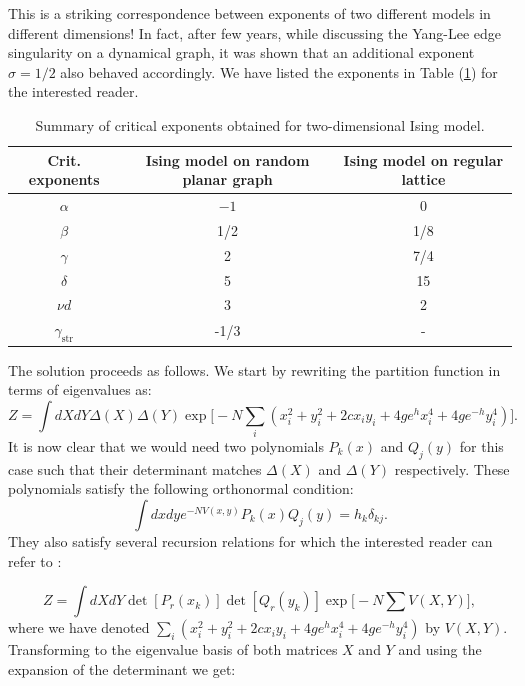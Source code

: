 \documentclass[letter,11pt]{article}
\begin{document}
This is a striking correspondence between exponents of two different models in different dimensions! In fact, 
after few years, while discussing the Yang-Lee edge singularity on a dynamical graph, it was shown that an additional exponent $\sigma =1/2$ 
also behaved accordingly. We have listed the exponents in Table (\ref{table:crit_exp}) for the interested reader.
\begin{table} 
	\begin{center} 
\begin{tabular}{|c|c|c|}
	\hline Crit. exponents & Ising model on random planar graph & Ising model on regular lattice \\
	\hline$\alpha$ & $-1$ & 0 \\
	$\beta$ & 1/2 & 1/8 \\
	$\gamma$ & 2 & 7/4 \\
	$\delta$ & 5 & 15 \\
	$\nu d$ & 3 & 2 \\
	$\gamma_{\text {str}}$ & -1/3 & - \\
	\hline
\end{tabular}
\end{center} 
	\caption{Summary of critical exponents obtained for two-dimensional Ising model.} 
	\label{table:crit_exp}
	\end{table} 
The solution proceeds as follows. We start by rewriting 
the partition function in terms of eigenvalues as:
\begin{equation}
	Z = \int dX dY \Delta(X) \Delta(Y)
	 \exp \Big[-N \sum_{i} (x_{i}^2 + y_{i}^{2} +2c x_{i}y_{i} + 4ge^{h}x_{i}^{4} + 4ge^{-h}y_{i}^4) \Big].
	\end{equation}
It is now clear that we would need two polynomials $P_{k}(x)$ and $Q_{j}(y)$ for this case 
such that their determinant matches $\Delta(X)$ and $\Delta(Y)$ respectively. 
These polynomials satisfy the following orthonormal condition: 
\begin{equation}
\int dx dy e^{-N V(x,y)} P_{k}(x) Q_{j}(y) = h_{k} \delta_{kj}. 
\end{equation}
They also satisfy several recursion relations for which the interested reader can refer to 
\cite{Boulatov:1986sb}:

\begin{equation}
	Z = \int dX dY \det[P_{r}(x_k)] \det[Q_{r}(y_k)] \exp\Big[-N \sum V(X,Y)\Big], 
\end{equation}
where we have denoted $\sum_{i} (x_{i}^2 + y_{i}^{2} +2c x_{i}y_{i} + 4ge^{h}x_{i}^{4} + 4ge^{-h}y_{i}^4)$ by $V(X,Y)$. 
Transforming to the eigenvalue basis of both matrices $X$ and $Y$ and using the expansion of the determinant we get:
\end{document}
